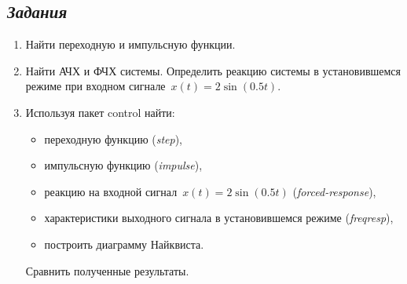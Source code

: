 \documentclass[a4paper,oneside,10pt]{book}
\theoremstyle{definition}
\begin{document}
\subsection*{\textit{Задания}}

\begin{enumerate}
\item
Найти переходную и импульсную функции. 
\item \label{ordinary_eq}
Найти АЧХ и ФЧХ системы. 
Определить реакцию системы в установившемся режиме при входном сигнале~$ x(t) = 2\sin(0.5t) $.

\item 
Используя пакет control найти: 
\begin{itemize}
	\item
	переходную функцию (\textit{step}), 
	\item
	импульсную функцию (\textit{impulse}),
	\item
	реакцию на входной сигнал~$ x(t) = 2\sin(0.5t) $ (\textit{forced-response}),
	\item 
	характеристики выходного сигнала в установившемся режиме (\textit{freqresp}),
	\item
	построить диаграмму Найквиста. 
\end{itemize}

Сравнить полученные результаты. 
\end{enumerate}
\end{document}
